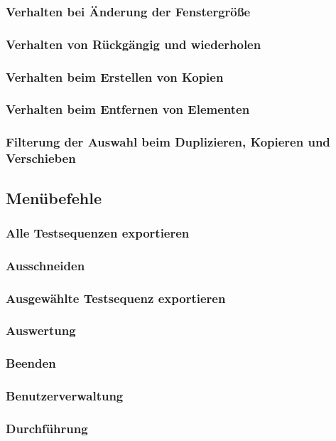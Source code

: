 \documentclass[a4paper,10pt]{scrartcl}
\begin{document}
\subsubsection{Verhalten bei Änderung der Fenstergröße}
\subsubsection{Verhalten von Rückgängig und wiederholen}
\subsubsection{Verhalten beim Erstellen von Kopien}
\subsubsection{Verhalten beim Entfernen von Elementen}
\subsubsection{Filterung der Auswahl beim Duplizieren, Kopieren und Verschieben}
\subsection{Menübefehle}
\subsubsection{Alle Testsequenzen exportieren}
\subsubsection{Ausschneiden}
\subsubsection{Ausgewählte Testsequenz exportieren}
\subsubsection{Auswertung}
\subsubsection{Beenden}
\subsubsection{Benutzerverwaltung}
\subsubsection{Durchführung}
\end{document}
